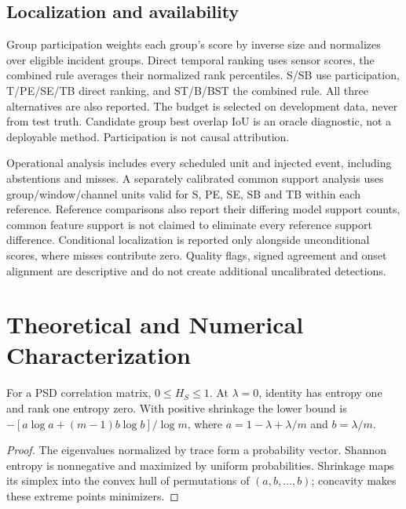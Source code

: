 \documentclass{llncs}
\begin{document}
\subsection{Localization and availability}
Group participation weights each group's score by inverse size and normalizes
over eligible incident groups. Direct temporal ranking uses sensor scores,
the combined rule averages their normalized rank percentiles. S/SB use
participation, T/PE/SE/TB direct ranking, and ST/B/BST the combined rule.
All three alternatives are also reported. The budget is selected on development
data, never from test truth. Candidate group best overlap IoU is an oracle
diagnostic, not a deployable method. Participation is not causal attribution.

Operational analysis includes every scheduled unit and injected event, including
abstentions and misses. A separately calibrated common support analysis uses
group/window/channel units valid for S, PE, SE, SB and TB within each reference.
Reference comparisons also report their differing model support counts, common
feature support is not claimed to eliminate every reference support difference.
Conditional localization is reported only alongside unconditional scores, where
misses contribute zero. Quality flags, signed agreement and onset alignment
are descriptive and do not create additional uncalibrated detections.





\section{Theoretical and Numerical Characterization}

\begin{proposition}
For a PSD correlation matrix, $0\leq H_S\leq1$. At $\lambda=0$, identity
has entropy one and rank one entropy zero. With positive shrinkage the lower
bound is $-[a\log a+(m-1)b\log b]/\log m$, where
$a=1-\lambda+\lambda/m$ and $b=\lambda/m$.
\end{proposition}

\begin{proof}
The eigenvalues normalized by trace form a probability vector. Shannon
entropy is nonnegative and maximized by uniform probabilities. Shrinkage maps
its simplex into the convex hull of permutations of $(a,b,\ldots,b)$;
concavity makes these extreme points minimizers.\end{proof}
\end{document}
